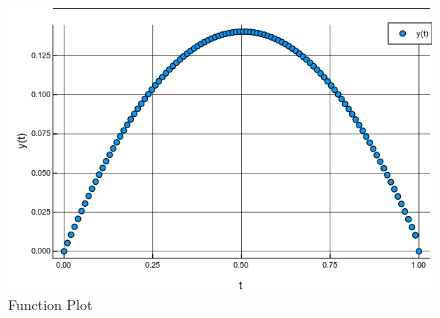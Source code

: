 \documentclass{article}
\begin{document}
\begin{figure}[h!]
    \centering
    \includegraphics[width=\textwidth]{../Homework3Plot.png}
    \caption{Function Plot}
\end{figure}
\end{document}
